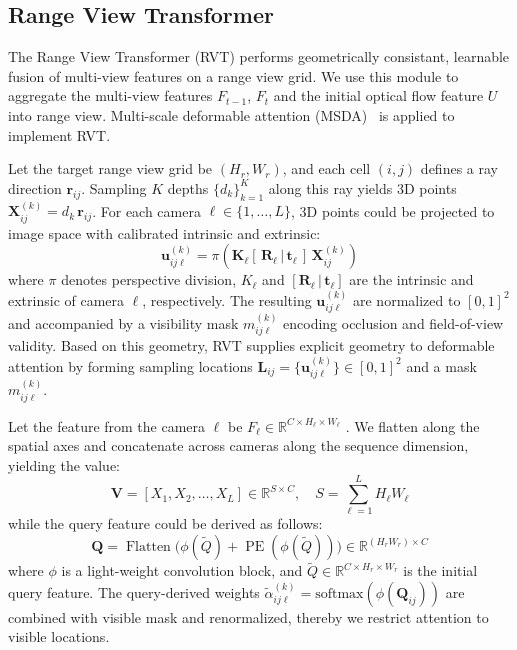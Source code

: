 \documentclass[journal]{IEEEtran}
\begin{document}
\subsection{Range View Transformer}
\label{sec:rv_agg}
The Range View Transformer (RVT) performs geometrically consistant, learnable fusion of multi-view features on a range view grid. We use this module to aggregate the multi-view features \(F_{t-1}\), \(F_{t}\) and the initial optical flow feature \(U\) into range view. Multi-scale deformable attention (MSDA)~\cite{zhu2020deformable} is applied to implement RVT. 

Let the target range view grid be \((H_r, W_r)\), and each cell \((i,j)\) defines a ray direction \(\mathbf{r}_{ij}\). Sampling \(K\) depths \(\{d_k\}_{k=1}^K\) along this ray yields 3D points \(\mathbf{X}_{ij}^{(k)} = d_k\,\mathbf{r}_{ij}\). For each camera \(\ell \in \{1,\dots,L\}\), 3D points could be projected to image space with calibrated intrinsic and extrinsic: 
\begin{equation}
\label{eq:ref_points}
\mathbf{u}_{ij\ell}^{(k)} = \pi(\mathbf{K}_\ell [\,\mathbf{R}_{\ell}\,|\,\mathbf{t}_{\ell}\,]\, \mathbf{X}_{ij}^{(k)})
\end{equation}
where \(\pi\) denotes perspective division, \(K_\ell\) and \([\mathbf{R}_{\ell}\,|\,\mathbf{t}_{\ell}]\) are the intrinsic and extrinsic of camera \(\ell\), respectively. The resulting \(\mathbf{u}_{ij\ell}^{(k)}\) are normalized to \([0,1]^2\) and accompanied by a visibility mask \(m_{ij\ell}^{(k)}\) encoding occlusion and field-of-view validity. Based on this geometry, RVT supplies explicit geometry to deformable attention by forming sampling locations \(\mathbf{L}_{ij} = \{\mathbf{u}_{ij\ell}^{(k)}\} \in [0,1]^2\) and a mask \(m_{ij\ell}^{(k)}\). 

Let the feature from the camera \(\ell\) be \(F_{\ell}\in \mathbb{R}^{C\times H_{\ell} \times W_{\ell}}\) . We flatten along the spatial axes and concatenate across cameras along the sequence dimension, yielding the value:
\begin{equation}
\label{eq:rva_value}
\mathbf{V} = \left [X_{1}, X_{2}, \dots, X_{L} \right]\in \mathbb{R}^{S\times C},\quad  S=\sum_{\ell=1}^{L}H_{\ell}W_{\ell}
\end{equation}
while the query feature could be derived as follows:
\begin{equation}
\label{eq:rva_query}
\mathbf{Q} = \operatorname{Flatten}\bigl(\phi{(\tilde{Q})} + \operatorname{PE}(\phi(\tilde{Q}))\bigr) \in \mathbb{R}^{(H_rW_r)\times C}
\end{equation}
where \(\phi\) is a light-weight convolution block, and \(\tilde {Q} \in \mathbb{R}^{C\times H_r\times W_r}\) is the initial query feature. The query-derived weights \(\tilde{\alpha}_{ij\ell}^{(k)} = \mathrm{softmax}(\phi(\mathbf{Q}_{ij}))\) are combined with visible mask and renormalized, thereby we restrict attention to visible locations. 
\end{document}
